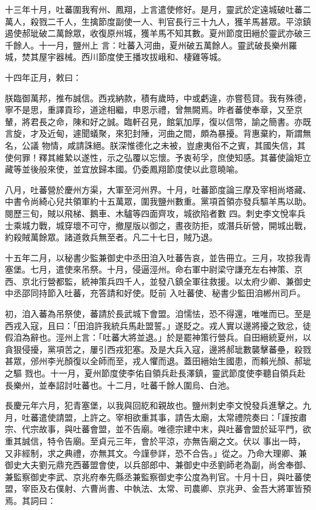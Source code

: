 \begin{pinyinscope}
 十三年十月，吐蕃圍我宥州、鳳翔，上言遣使修好。是月，靈武於定遠城破吐蕃二萬人，殺戮二千人，生擒節度副使一人、判官長行三十九人，獲羊馬甚眾。平涼鎮遏使郝玼破二萬餘眾，收復原州城，獲羊馬不知其數。夏州節度田縉於靈武亦破三千餘人。十一月，鹽州上
 言：吐蕃入河曲，夏州破五萬餘人。靈武破長樂州羅城，焚其屋宇器械。西川節度使王播攻拔峨和、棲雞等城。



 十四年正月，敕曰：



 朕臨御萬邦，推布誠信。西戎納款，積有歲時，中或虧違，亦嘗苞貸。我有殊德，寧不是思，重譯貢珍，道途相繼，申恩示禮，曾無闕焉。昨者蕃使奉章，又至京輦，將君長之命，陳和好之誠。臨軒召見，館氣加厚，復以信幣，諭之簡書。亦既言旋，才及近甸，遽聞蟻聚，來犯封陲，河曲之間，頗為暴擾。背惠棄約，斯謂無名，公議
 物情，咸請誅絕。朕深惟德化之未被，豈慮夷俗不之賓，其國失信，其使何罪！釋其維縶以遂性，示之弘覆以忘懷。予衷茍孚，庶使知感。其蕃使論矩立藏等並後般來使，並宜放歸本國。仍委鳳翔節度使以此意曉喻。



 八月，吐蕃營於慶州方渠，大軍至河州界。十月，吐蕃節度論三摩及宰相尚塔藏、中書令尚綺心兒共領軍約十五萬眾，圍我鹽州數重。黨項首領亦發兵驅羊馬以助。閱歷三旬，賊以飛梯、鵝車、木驢等四面齊攻，城欲陷者數
 四。刺史李文悅率兵士乘城力戰，城穿壞不可守，撤屋版以御之，晝夜防拒，或潛兵斫營，開城出戰，約殺賊萬餘眾。諸道救兵無至者。凡二十七日，賊乃退。



 十五年二月，以秘書少監兼御史中丞田洎入吐蕃告哀，並告冊立。三月，攻掠我青塞堡。七月，遣使來吊祭。十月，侵逼涇州。命右軍中尉梁守謙充左右神策、京西、京北行營都監，統神策兵四千人，並發八鎮全軍往救援。以太府少卿、兼御史中丞邵同持節入吐蕃，充答請和好使。貶前
 入吐蕃使、秘書少監田洎郴州司戶。



 初，洎入蕃為吊祭使，蕃請於長武城下會盟。洎懦怯，恐不得還，唯唯而已。至是西戎入寇，且曰：「田洎許我統兵馬赴盟誓。」遂貶之。戎人實以邊將擾之致忿，徒假洎為辭也。涇州上言：「吐蕃大將並退。」於是罷神策行營兵。自田縉統夏州，以貪狠侵擾，黨項苦之，屢引西戎犯塞。及是大兵入寇，邊將郝玼數襲擊蕃壘，殺戮甚眾，邠州李光顏復以全師而至，戎人懼而退。蓋田縉始生國患，而賴光顏、郝玼之驅
 戮也。十一月，夏州節度使李佑自領兵赴長澤鎮，靈武節度使李聽自領兵赴長樂州，並奉詔討吐蕃也。十二月，吐蕃千餘人圍烏、白池。



 長慶元年六月，犯青塞堡，以我與回紇和親故也。鹽州刺史李文悅發兵進擊之。九月，吐蕃遣使請盟，上許之。宰相欲重其事，請告太廟，太常禮院奏曰：「謹按肅宗、代宗故事，與吐蕃會盟，並不告廟。唯德宗建中末，與吐蕃會盟於延平門，欲重其誠信，特令告廟。至貞元三年，會於平涼，亦無告廟之文。伏以
 事出一時，又非經制，求之典禮，亦無其文。今謹參詳，恐不合告。」從之。乃命大理卿、兼御史大夫劉元鼎充西蕃盟會使，以兵部郎中、兼御史中丞劉師老為副，尚舍奉御、兼監察御史李武、京兆府奉先縣丞兼監察御史李公度為判官。十月十日，與吐蕃使盟，宰臣及右僕射、六曹尚書、中執法、太常、司農卿、京兆尹、金吾大將軍皆預焉。其詞曰：




\end{pinyinscope}
